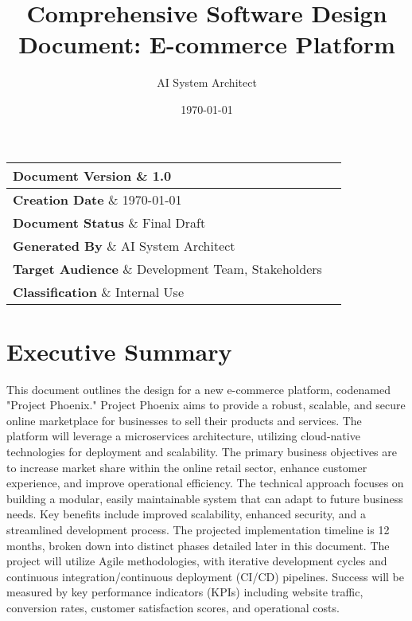 \documentclass[11pt,a4paper,oneside]{article}
\title{\Huge\textbf{Comprehensive Software Design Document: E-commerce Platform}}
\author{\Large AI System Architect}
\date{\Large\today}
\begin{document}
\maketitle
\thispagestyle{empty}
\vfill

\begin{center}
\large
\begin{tabular}{|l|l|}
\hline
\textbf{Document Version} \& 1.0 \\
\hline
\textbf{Creation Date} \& \today \\
\hline
\textbf{Document Status} \& Final Draft \\
\hline
\textbf{Generated By} \& AI System Architect \\
\hline
\textbf{Target Audience} \& Development Team, Stakeholders \\
\hline
\textbf{Classification} \& Internal Use \\
\hline
\end{tabular}
\end{center}

\newpage
\tableofcontents
\newpage
\listoffigures
\newpage

\section{Executive Summary}

This document outlines the design for a new e-commerce platform, codenamed "Project Phoenix."  Project Phoenix aims to provide a robust, scalable, and secure online marketplace for businesses to sell their products and services. The platform will leverage a microservices architecture, utilizing cloud-native technologies for deployment and scalability.  The primary business objectives are to increase market share within the online retail sector, enhance customer experience, and improve operational efficiency. The technical approach focuses on building a modular, easily maintainable system that can adapt to future business needs. Key benefits include improved scalability, enhanced security, and a streamlined development process. The projected implementation timeline is 12 months, broken down into distinct phases detailed later in this document.  The project will utilize Agile methodologies, with iterative development cycles and continuous integration/continuous deployment (CI/CD) pipelines.  Success will be measured by key performance indicators (KPIs) including website traffic, conversion rates, customer satisfaction scores, and operational costs.
\end{document}

